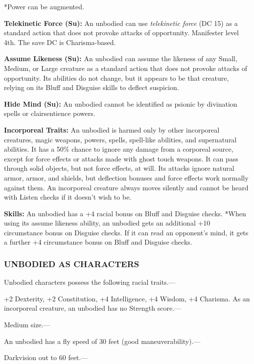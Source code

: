 \documentclass{article}
\begin{document}
*Power can be augmented. 

\textbf{Telekinetic Force (Su):} An unbodied can use \textit{telekinetic force 
}(DC 15) as a standard action that does not provoke attacks of opportunity. Manifester 
level 4th. The save DC is Charisma-based.

\textbf{Assume Likeness (Su):} An unbodied can assume the likeness of any Small, 
Medium, or Large creature as a standard action that does not provoke attacks of 
opportunity. Its abilities do not change, but it appears to be that creature, relying 
on its Bluff and Disguise skills to deflect suspicion.

\textbf{Hide Mind (Su): }An unbodied cannot be identified as psionic by divination 
spells or clairsentience powers. 

\textbf{Incorporeal Traits:} An unbodied is harmed only by other incorporeal creatures, 
magic weapons, powers, spells, spell-like abilities, and supernatural abilities. 
It has a 50\% chance to ignore any damage from a corporeal source, except for force 
effects or attacks made with ghost touch weapons. It can pass through solid objects, 
but not force effects, at will. Its attacks ignore natural armor, armor, and shields, 
but deflection bonuses and force effects work normally against them. An incorporeal 
creature always moves silently and cannot be heard with Listen checks if it doesn't 
wish to be.

\textbf{Skills:} An unbodied has a +4 racial bonus on Bluff and Disguise checks. 
*When using its assume likeness ability, an unbodied gets an additional +10 circumstance 
bonus on Disguise checks. If it can read an opponent's mind, it gets a further 
+4 circumstance bonus on Bluff and Disguise checks.

\subsubsection*{UNBODIED AS CHARACTERS}

Unbodied characters possess the following racial traits.--- 

\parindent=3pt
+2 Dexterity, +2 Constitution, +4 Intelligence, +4 Wisdom, +4 Charisma. As an incorporeal 
creature, an unbodied has no Strength score.---

\parindent=0pt
Medium size.---

An unbodied has a fly speed of 30 feet (good maneuverability).---

Darkvision out to 60 feet.---
\end{document}
